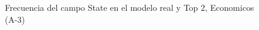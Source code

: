 \begin{figure}[H]
    \centering
    
    \caption{Frecuencia del campo State en el modelo real y Top 2, Economicos (A-3)}
    \label{frecuency-State-top2}
\end{figure}